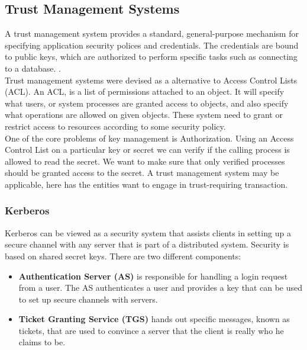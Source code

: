 \documentclass[11pt, a4paper, notitlepage]{article}
\begin{document}
\subsection*{Trust Management Systems}
A trust management system provides a standard, general-purpose mechanism for specifying application security polices and credentials. The credentials are bound to public keys, which are authorized to perform specific tasks such as connecting to a database. \cite{blaze1999keynote}. \\

Trust management systems were devised as a alternative to Access Control Lists (ACL). An ACL, is a list of permissions attached to an object. It will specify what users, or system processes are granted access to objects, and also specify what operations are allowed on given objects. \cite{acl-rfc} These system need to grant or restrict access to resources according to some security policy. \\

One of the core problems of key management is Authorization. Using an Access Control List on a particular key or secret we can verify if the calling process is allowed to read the secret. We want to make sure that only verified processes should be granted access to the secret. A trust management system may be applicable, here has the entities want to engage in trust-requiring transaction.\cite{herzberg2000access} \\


\subsubsection*{Kerberos}
Kerberos can be viewed as a security system that assists clients in setting up a secure channel with any server that is part of a distributed system. Security is based on shared secret keys. There are two different components: 
\begin{itemize}
\item \textbf{Authentication Server (AS)} is responsible for handling a login request from a user. The AS authenticates a user and provides a key that can be used to set up secure channels with servers.
\item \textbf{Ticket Granting Service (TGS)} hands out specific messages, known as tickets, that are used to convince a server that the client is really who he claims to be.
\end{itemize}

\makeblankpage
\end{document}

